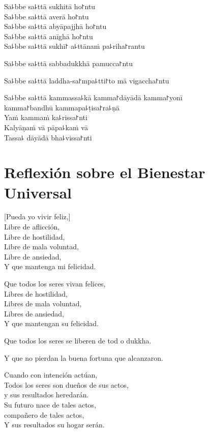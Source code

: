 Sa꜕bbe sa꜕ttā sukhitā ho꜓ntu\\
Sa꜕bbe sa꜕ttā averā ho꜓ntu\\
Sa꜕bbe sa꜕ttā abyāpajjhā ho꜓ntu\\
Sa꜕bbe sa꜕ttā anīghā ho꜓ntu\\
Sa꜕bbe sa꜕ttā sukhī꜓ a꜕ttānaṁ pa꜕riha꜓rantu

Sa꜕bbe sa꜕ttā sabbadukkhā pamucca꜓ntu

Sa꜕bbe sa꜕ttā laddha-sa꜓mpa꜕tti꜓to mā vigaccha꜓ntu

Sa꜕bbe sa꜕ttā kammassa꜕kā kamma꜓dāyādā kamma꜓yonī\\
\vin kamma꜓bandhū kammapa꜕ṭisa꜓ra꜕ṇā\\
Yaṁ kammaṁ ka꜕rissa꜓nti\\
Kalyāṇaṁ vā pāpa꜕kaṁ vā\\
Tassa꜕ dāyādā bha꜕vissa꜓nti

\chapter[Bienestar Universal]{Reflexión sobre el Bienestar Universal}


\begin{leader}
\end{leader}

[Pueda yo vivir feliz,]\\
Libre de aflicción,\\
Libre de hostilidad,\\
Libre de mala voluntad,\\
Libre de ansiedad,\\
Y que mantenga mi felicidad.

Que todos los seres vivan felices,\\
Libres de hostilidad,\\
Libres de mala voluntad,\\
Libres de ansiedad,\\
Y que mantengan su felicidad.

Que todos los seres se liberen de tod
o dukkha.

Y que no pierdan la buena fortuna que alcanzaron.

Cuando con intención actúan,\\
Todos los seres son dueños de sus actos, \\ 
y sus resultados heredarán.\\
Su futuro nace de tales actos, \\
compañero de tales actos,\\
Y sus resultados su hogar serán.
\enlargethispage{3\baselineskip}

